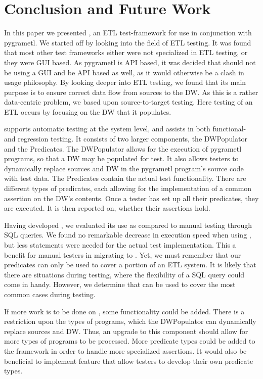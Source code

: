 \section{Conclusion and Future Work}\label{sect:conc}

In this paper we presented \FW{}, an ETL test-framework for use in conjunction with pygrametl. We started off by looking into the field of ETL testing. It was found that most other test frameworks either were not specialized in ETL testing, or they were GUI based. As pygrametl is API based, it was decided that \FW{} should not be using a GUI and be API based as well, as it would otherwise be a clash in usage philosophy. By looking deeper into ETL testing, we found that its main purpose is to ensure correct data flow from sources to the DW. As this is a rather data-centric problem, we based \FW{} upon source-to-target testing. Here testing of an ETL occurs by focusing on the DW that it populates. 

\FW{} supports automatic testing at the system level, and assists in both functional- and regression testing. It consists of two larger components, the DWPopulator and the Predicates. The DWPopulator allows for the execution of pygrametl programs, so that a DW may be populated for test. It also allows testers to dynamically replace sources and DW in the pygrametl program’s source code with test data. The Predicates contain the actual test functionality. There are different types of predicates, each allowing for the implementation of a common assertion on the DW’s contents. Once a tester has set up all their predicates, they are executed. It is then reported on, whether their assertions hold. 

Having developed \FW{}, we evaluated its use as compared to manual testing through SQL queries. We found no remarkable decrease in execution speed when using \FW{}, but less statements were needed for the actual test implementation. This a benefit for manual testers in migrating to \FW{}. Yet, we must remember that our predicates can only be used to cover a portion of an ETL system. It is likely that there are situations during testing, where the flexibility of a SQL query could come in handy. However, we determine that \FW{} can be used to cover the most common cases during testing.

If more work is to be done on \FW{}, some functionality could be added. There is a restriction upon the types of programs,  which the DWPopulator can dynamically replace sources and DW. Thus, an upgrade to this component should allow for more types of programs to be processed. More predicate types could be added to the framework in order to handle more specialized assertions. It would also be beneficial to implement feature that allow testers to develop their own predicate types. 



